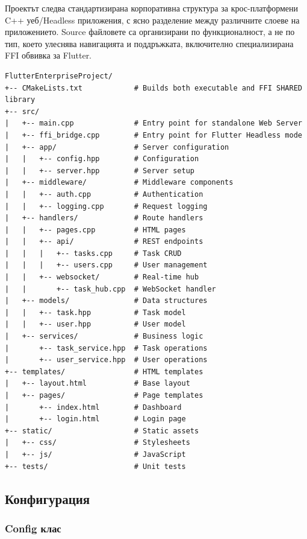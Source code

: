 Проектът следва стандартизирана корпоративна структура за крос-платформени C++ уеб/Headless приложения, с ясно разделение между различните слоеве на приложението. Source файловете са организирани по функционалност, а не по тип, което улеснява навигацията и поддръжката, включително специализирана FFI обвивка за Flutter.

\begin{lstlisting}[basicstyle=\small\ttfamily, frame=none, numbers=none]
FlutterEnterpriseProject/
+-- CMakeLists.txt            # Builds both executable and FFI SHARED library
+-- src/
|   +-- main.cpp              # Entry point for standalone Web Server
|   +-- ffi_bridge.cpp        # Entry point for Flutter Headless mode
|   +-- app/                  # Server configuration
|   |   +-- config.hpp        # Configuration
|   |   +-- server.hpp        # Server setup
|   +-- middleware/           # Middleware components
|   |   +-- auth.cpp          # Authentication
|   |   +-- logging.cpp       # Request logging
|   +-- handlers/             # Route handlers
|   |   +-- pages.cpp         # HTML pages
|   |   +-- api/              # REST endpoints
|   |   |   +-- tasks.cpp     # Task CRUD
|   |   |   +-- users.cpp     # User management
|   |   +-- websocket/        # Real-time hub
|   |       +-- task_hub.cpp  # WebSocket handler
|   +-- models/               # Data structures
|   |   +-- task.hpp          # Task model
|   |   +-- user.hpp          # User model
|   +-- services/             # Business logic
|       +-- task_service.hpp  # Task operations
|       +-- user_service.hpp  # User operations
+-- templates/                # HTML templates
|   +-- layout.html           # Base layout
|   +-- pages/                # Page templates
|       +-- index.html        # Dashboard
|       +-- login.html        # Login page
+-- static/                   # Static assets
|   +-- css/                  # Stylesheets
|   +-- js/                   # JavaScript
+-- tests/                    # Unit tests
\end{lstlisting}

\subsection{Конфигурация}

\subsubsection{Config клас}

